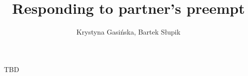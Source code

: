 \documentclass[12pt, a4paper]{article}
\title{Responding to partner's preempt}
\author{Krystyna Gasińska, Bartek Słupik}
\begin{document}
\maketitle


TBD

\end{document}
